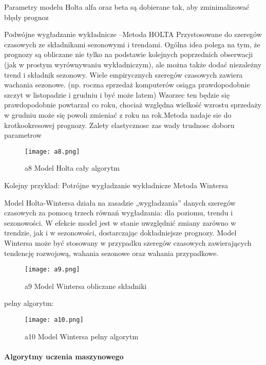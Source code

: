Parametry modelu Holta alfa oraz beta są dobierane tak, aby zminimalizować błędy prognoz\cite{szos2012}

Podwójne wygładzanie wykładnicze –Metoda HOLTA Przystosowane do szeregów czasowych ze składnikami 
sezonowymi i trendami.  Ogólna idea polega na tym, że prognozy są obliczane nie tylko 
na podstawie kolejnych poprzednich obserwacji (jak w prostym  wyrównywaniu wykładniczym), ale można także dodać niezależny trend i składnik sezonowy. 
 Wiele empirycznych szeregów czasowych zawiera wachania sezonowe. (np. roczna sprzedaż komputerów osiąga prawdopodobnie szczyt w listopadzie i grudniu i być może latem) Wzorzec ten będzie się prawdopodobnie powtarzał co roku, chociaż względna wielkość wzrostu sprzedaży w grudniu może się powoli zmieniać z roku na rok.Metoda nadaje sie do krotkookresowej prognozy. Zalety elastycznosc zas  wady trudnosc doboru parametrow\cite{szer2009}

\begin{figure}[h!]
    \label{fig:a8}
    \centering \texttt{[image: a8.png]}
    \caption{a8 Model Holta  cały algorytm\cite{szer2009}}
\end{figure}


Kolejny przyklad: Potrójne wygładzanie wykładnicze Metoda Wintersa

Model Holta-Wintersa działa na zasadzie „wygładzania” danych szeregów czasowych za pomocą trzech równań wygładzania: dla poziomu, trendu i sezonowości. W efekcie model jest w stanie uwzględnić zmiany zarówno w trendzie, jak i w sezonowości, dostarczając dokładniejsze prognozy.\cite{exc2018}
Model Wintersa może być stosowany w przypadku szeregów czasowych zawierających tendencję rozwojową, wahania sezonowe oraz wahania przypadkowe. \cite{win2023}

\begin{figure}[h!]
    \label{fig:a9}
    \centering \texttt{[image: a9.png]}
    \caption{a9 Model Wintersa  obliczane składniki \cite{win2023}}
\end{figure}

pelny algorytm:

\begin{figure}[h!]
    \label{fig:a10}
    \centering \texttt{[image: a10.png]}
    \caption{a10 Model Wintersa  pelny algorytm \cite{szer2009}}
\end{figure}

\newpage

\paragraph{Algorytmy uczenia maszynowego}



